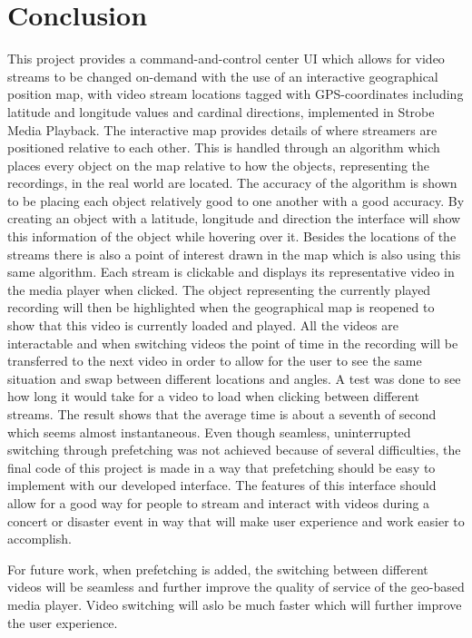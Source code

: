 \chapter{Conclusion}
\label{cha:conclusion}

This project provides a command-and-control center UI which allows for video streams to be changed on-demand with the use of an interactive geographical position map, with video stream locations tagged with GPS-coordinates including latitude and longitude values and cardinal directions, implemented in Strobe Media Playback. The interactive map provides details of where streamers are positioned relative to each other. This is handled through an algorithm which places every object on the map relative to how the objects, representing the recordings, in the real world are located. The accuracy of the algorithm is shown to be placing each object relatively good to one another with a good accuracy. By creating an object with a latitude, longitude and direction the interface will show this information of the object while hovering over it. Besides the locations of the streams there is also a point of interest drawn in the map which is also using this same algorithm. Each stream is clickable and displays its representative video in the media player when clicked. The object representing the currently played recording will then be highlighted when the geographical map is reopened to show that this video is currently loaded and played. All the videos are interactable and when switching videos the point of time in the recording will be transferred to the next video in order to allow for the user to see the same situation and swap between different locations and angles. A test was done to see how long it would take for a video to load when clicking between different streams. The result shows that the average time is about a seventh of second which seems almost instantaneous. Even though seamless, uninterrupted switching through prefetching was not achieved because of several difficulties, the final code of this project is made in a way that prefetching should be easy to implement with our developed interface. The features of this interface should allow for a good way for people to stream and interact with videos during a concert or disaster event in way that will make user experience and work easier to accomplish. 

For future work, when prefetching is added, the switching between different videos will be seamless and further improve the quality of service of the geo-based media player. Video switching will aslo be much faster which will further improve the user experience.